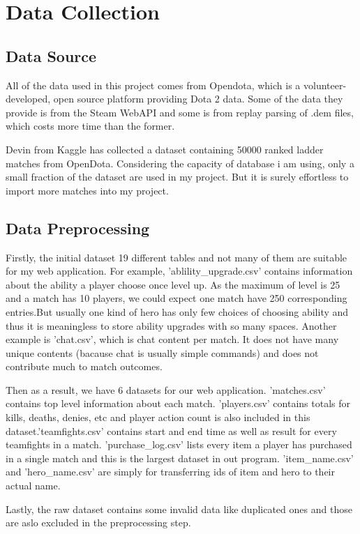 \documentclass[a4paper]{article}
\begin{document}
\section{Data Collection}
\subsection{Data Source}
All of the data used in this project comes from Opendota, which is a volunteer-developed, open source platform providing Dota 2 data. Some of the data they provide is from the Steam WebAPI and some is from replay parsing of .dem files, which costs more time than the former.\par
\noindent Devin from Kaggle has collected a dataset containing 50000 ranked ladder matches from OpenDota. Considering the capacity of database i am using, only a small fraction of the dataset are used in my project. But it is surely effortless to import more matches into my project.\par
\subsection{Data Preprocessing}
Firstly, the initial dataset 19 different tables and not many of them are suitable for my web application. For example, 'ablility\_upgrade.csv' contains information about the ability a player choose once level up. As the maximum of level is 25 and a match has 10 players, we could expect one match have 250 corresponding entries.But usually one kind of hero has only few choices of choosing ability and thus it is meaningless to store ability upgrades with so many spaces. Another example is 'chat.csv', which is chat content per match. It does not have many unique contents (bacause chat is usually simple commands) and does not contribute much to match outcomes.\par
\noindent Then as a result, we have 6 datasets for our web application. 'matches.csv' contains top level information about each match. 'players.csv' contains totals for kills, deaths, denies, etc and player action count is also included in this dataset.'teamfights.csv' contains start and end time as well as result for every teamfights in a match. 'purchase\_log.csv' lists every item a player has purchased in a single match and this is the largest dataset in out program. 'item\_name.csv' and 'hero\_name.csv' are simply for transferring ids of item and hero to their actual name.\par
\noindent Lastly, the raw dataset contains some invalid data like duplicated ones and those are aslo excluded in the preprocessing step.
\end{document}

